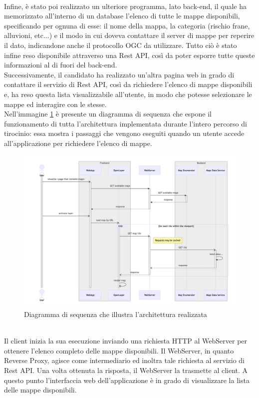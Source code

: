 \\Infine, è stato poi realizzato un ulteriore programma, lato back-end, il quale ha memorizzato all'interno di un database l'elenco di tutte le mappe disponibili, specificando per ognuna di esse: il nome della mappa, la categoria (rischio frane, alluvioni, etc...) e il modo in cui doveva contattare il server di mappe per reperire il dato, indicandone anche il protocollo OGC da utilizzare. Tutto ciò è stato infine reso disponibile attraverso una Rest API, così da poter esporre tutte queste informazioni al di fuori del back-end. 
\\Successivamente, il candidato ha realizzato un'altra pagina web in grado di contattare il servizio di Rest API, così da richiedere l'elenco di mappe disponibili e, ha reso questa lista visualizzabile all'utente, in modo che potesse selezionare le mappe ed interagire con le stesse.
\medskip
\\Nell'immagine \ref{fig:BMSArchitectureSequenceDiagram} è presente un diagramma di sequenza che espone il funzionamento di tutta l'architettura implementata durante l'intero percorso di tirocinio: essa mostra i passaggi che vengono eseguiti quando un utente accede all'applicazione per richiedere l'elenco di mappe.
\begin{figure}[htbp]
      \centering
      \includegraphics[width=1\textwidth]{Tesi/images/Capitolo8/BMSArchitectureSequenceDiagram.jpg}
      \caption{Diagramma di sequenza che illustra l'architettura realizzata}
      \label{fig:BMSArchitectureSequenceDiagram}
\end{figure}
\\Il client inizia la sua esecuzione inviando una richiesta HTTP al WebServer per ottenere l'elenco completo delle mappe disponibili. Il WebServer, in quanto Reverse Proxy, agisce come intermediario ed inoltra tale richiesta al servizio di Rest API. Una volta ottenuta la risposta, il WebServer la trasmette al client. A questo punto l'interfaccia web dell'applicazione è in grado di visualizzare la lista delle mappe disponibili.
